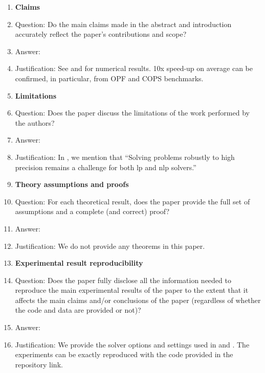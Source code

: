 \documentclass{article}
\begin{document}
\begin{enumerate}

\item {\bf Claims}
    \item[] Question: Do the main claims made in the abstract and introduction accurately reflect the paper's contributions and scope?
    \item[] Answer: \answerYes{} %
    \item[] Justification: See  and  for numerical results. 10x speed-up on average can be confirmed, in particular, from OPF and COPS benchmarks.

\item {\bf Limitations}
    \item[] Question: Does the paper discuss the limitations of the work performed by the authors?
    \item[] Answer: \answerYes{} %
    \item[] Justification: In , we mention that ``Solving problems robustly to high precision remains a challenge for both \gls*{lp} and \gls*{nlp} solvers.''

\item {\bf Theory assumptions and proofs}
    \item[] Question: For each theoretical result, does the paper provide the full set of assumptions and a complete (and correct) proof?
    \item[] Answer: \answerNA{} %
    \item[] Justification: We do not provide any theorems in this paper.

    \item {\bf Experimental result reproducibility}
    \item[] Question: Does the paper fully disclose all the information needed to reproduce the main experimental results of the paper to the extent that it affects the main claims and/or conclusions of the paper (regardless of whether the code and data are provided or not)?
    \item[] Answer: \answerYes{} %
    \item[] Justification: We provide the solver options and settings used in  and . The experiments can be exactly reproduced with the code provided in the repository link.


\end{enumerate}
\end{document}
